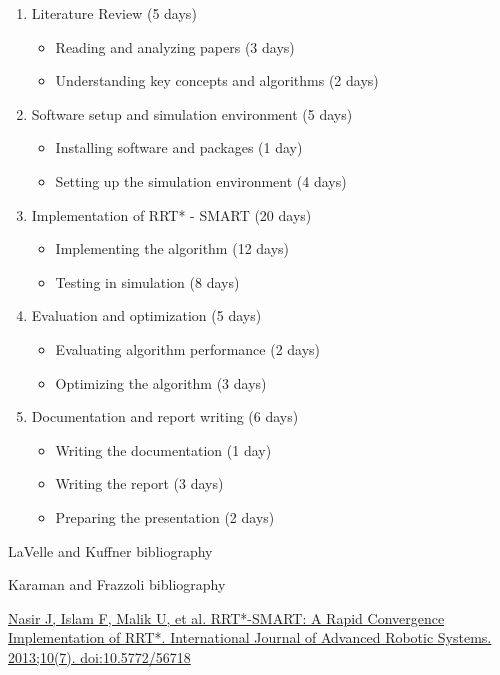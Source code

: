 \documentclass[12pt]{extarticle}
\begin{document}
\begin{enumerate}
	\item Literature Review (5 days)
	\begin{itemize}
		\item Reading and analyzing papers (3 days)
		\item Understanding key concepts and algorithms (2 days)
	\end{itemize}
	
	\item Software setup and simulation environment (5 days)
	\begin{itemize}
		\item Installing software and packages (1 day)
		\item Setting up the simulation environment (4 days)
	\end{itemize}
	
	\item Implementation of RRT* - SMART (20 days)
	\begin{itemize}
		\item Implementing the algorithm (12 days)
		\item Testing in simulation (8 days)
	\end{itemize}

	\item Evaluation and optimization (5 days)
	\begin{itemize}
		\item Evaluating algorithm performance (2 days)
		\item Optimizing the algorithm (3 days)
	\end{itemize}

	\item Documentation and report writing (6 days)
	\begin{itemize}
		\item Writing the documentation (1 day)
		\item Writing the report (3 days)
		\item Preparing the presentation (2 days)
	\end{itemize}
\end{enumerate}
\newpage
\begin{thebibliography}{9}
	LaVelle and Kuffner bibliography

	Karaman and Frazzoli bibliography
	
	\href{https://journals.sagepub.com/doi/10.5772/56718}{Nasir J, Islam F, Malik U, et al. RRT*-SMART: A Rapid Convergence Implementation of RRT*. International Journal of Advanced Robotic Systems. 2013;10(7). doi:10.5772/56718}
\end{thebibliography}
\end{document}
